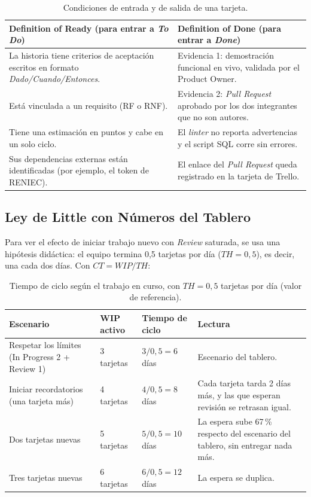 \documentclass[11pt,a4paper]{article}
\begin{document}
\begin{table}[H]
\centering
\small
\renewcommand{\arraystretch}{1.25}
\begin{tabularx}{\textwidth}{YY}
\toprule
\textbf{Definition of Ready (para entrar a \textit{To Do})} & \textbf{Definition of Done (para entrar a \textit{Done})} \\
\midrule
La historia tiene criterios de aceptación escritos en formato \textit{Dado/Cuando/Entonces}. &
Evidencia 1: demostración funcional en vivo, validada por el Product Owner. \\
Está vinculada a un requisito (RF o RNF). &
Evidencia 2: \textit{Pull Request} aprobado por los dos integrantes que no son autores. \\
Tiene una estimación en puntos y cabe en un solo ciclo. &
El \textit{linter} no reporta advertencias y el script SQL corre sin errores. \\
Sus dependencias externas están identificadas (por ejemplo, el token de RENIEC). &
El enlace del \textit{Pull Request} queda registrado en la tarjeta de Trello. \\
\bottomrule
\end{tabularx}
\caption{Condiciones de entrada y de salida de una tarjeta.}
\label{tab:dor_dod}
\end{table}

\subsection{Ley de Little con Números del Tablero}

Para ver el efecto de iniciar trabajo nuevo con \textit{Review} saturada, se usa una hipótesis didáctica: el equipo termina 0,5 tarjetas por día ($TH = 0{,}5$), es decir, una cada dos días. Con $CT = WIP / TH$:

\begin{table}[H]
\centering
\small
\renewcommand{\arraystretch}{1.2}
\begin{tabularx}{\textwidth}{P{3.6cm}P{2.6cm}P{2.6cm}Y}
\toprule
\textbf{Escenario} & \textbf{WIP activo} & \textbf{Tiempo de ciclo} & \textbf{Lectura} \\
\midrule
Respetar los límites (In Progress 2 + Review 1) & 3 tarjetas & $3/0{,}5 = 6$ días & Escenario del tablero. \\
Iniciar recordatorios (una tarjeta más) & 4 tarjetas & $4/0{,}5 = 8$ días & Cada tarjeta tarda 2 días más, y las que esperan revisión se retrasan igual. \\
Dos tarjetas nuevas & 5 tarjetas & $5/0{,}5 = 10$ días & La espera sube 67\,\% respecto del escenario del tablero, sin entregar nada más. \\
Tres tarjetas nuevas & 6 tarjetas & $6/0{,}5 = 12$ días & La espera se duplica. \\
\bottomrule
\end{tabularx}
\caption{Tiempo de ciclo según el trabajo en curso, con $TH = 0{,}5$ tarjetas por día (valor de referencia).}
\label{tab:little}
\end{table}
\end{document}
